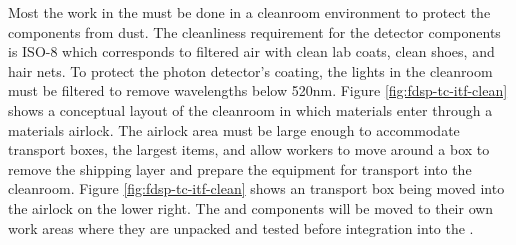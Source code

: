 Most the work in the  must be done in a cleanroom environment to protect the components from dust. The cleanliness requirement for the detector components is ISO-8 which corresponds to filtered air with clean lab coats, clean shoes, and hair nets. To protect the photon detector's  coating, the lights in the cleanroom must be filtered to remove wavelengths below 520nm.\cite{LBNE-docdb-8348}  Figure \ref{fig:fdsp-tc-itf-clean} shows a conceptual layout of the  cleanroom in which materials enter through a materials airlock. The airlock area  must be large enough to accommodate  transport boxes, the largest items, and allow workers to move around a box to remove the shipping layer and prepare the equipment for transport into the cleanroom.  Figure \ref{fig:fdsp-tc-itf-clean} shows an  transport box being moved into the airlock on the lower right. The  and  components will be moved to their own work areas where they are unpacked and tested before integration into the . 

